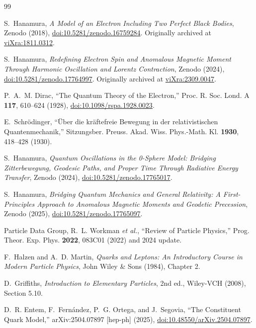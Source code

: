 \documentclass[%
 reprint, amsmath,amssymb, aps, prc, ]{revtex4-2}
\numberwithin{equation}{section}
\begin{document}
\begin{thebibliography}{99}

S.~Hanamura, \textit{A Model of an Electron Including Two Perfect Black Bodies}, Zenodo (2018), \href{https://doi.org/10.5281/zenodo.16759284}{doi:10.5281/zenodo.16759284}. Originally archived at \href{https://vixra.org/abs/1811.0312}{viXra:1811.0312}.

S.~Hanamura, \textit{Redefining Electron Spin and Anomalous Magnetic Moment Through Harmonic Oscillation and Lorentz Contraction}, Zenodo (2024), \href{https://doi.org/10.5281/zenodo.17764997}{doi:10.5281/zenodo.17764997}. Originally archived at \href{https://vixra.org/abs/2309.0047}{viXra:2309.0047}.

P.~A.~M. Dirac, ``The Quantum Theory of the Electron,'' Proc. R. Soc. Lond. A \textbf{117}, 610--624 (1928), \href{https://doi.org/10.1098/rspa.1928.0023}{doi:10.1098/rspa.1928.0023}.

E.~Schr\"odinger, ``\"Uber die kr\"aftefreie Bewegung in der relativistischen Quantenmechanik,'' Sitzungsber. Preuss. Akad. Wiss. Phys.-Math. Kl. \textbf{1930}, 418--428 (1930).

S.~Hanamura, \textit{Quantum Oscillations in the 0-Sphere Model: Bridging Zitterbewegung, Geodesic Paths, and Proper Time Through Radiative Energy Transfer}, Zenodo (2024), \href{https://doi.org/10.5281/zenodo.17765017}{doi:10.5281/zenodo.17765017}.

S.~Hanamura, \textit{Bridging Quantum Mechanics and General Relativity: A First-Principles Approach to Anomalous Magnetic Moments and Geodetic Precession}, Zenodo (2025), \href{https://doi.org/10.5281/zenodo.17765097}{doi:10.5281/zenodo.17765097}.

Particle Data Group, R.~L. Workman \textit{et al.}, ``Review of Particle Physics,'' Prog. Theor. Exp. Phys. \textbf{2022}, 083C01 (2022) and 2024 update.

F.~Halzen and A.~D. Martin, \textit{Quarks and Leptons: An Introductory Course in Modern Particle Physics}, John Wiley \& Sons (1984), Chapter 2.

D.~Griffiths, \textit{Introduction to Elementary Particles}, 2nd ed., Wiley-VCH (2008), Section 5.10.

D.~R. Entem, F.~Fern\'andez, P.~G. Ortega, and J.~Segovia, ``The Constituent Quark Model,'' arXiv:2504.07897 [hep-ph] (2025), \href{https://doi.org/10.48550/arXiv.2504.07897}{doi:10.48550/arXiv.2504.07897}.


\end{thebibliography}
\end{document}
